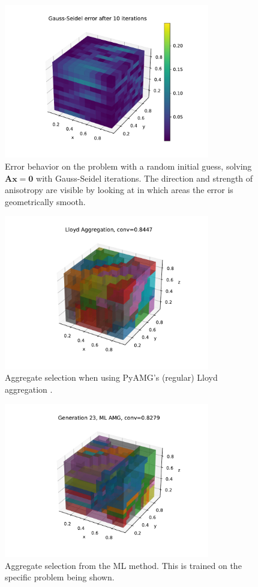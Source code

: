 \documentclass{article}
\newcommand{\mat}[1]{\bm{{#1}}}
\begin{document}
\begin{figure}[h]
  \centering
  \includegraphics[width=0.8\textwidth]{gs_error.pdf}
  \caption{Error behavior on the problem with a random initial guess, solving $\mat{Ax}=\mat{0}$ with Gauss-Seidel iterations.  The direction and strength of anisotropy are visible by looking at in which areas the error is geometrically smooth.}
  \label{fig:gs_error}
\end{figure}

\begin{figure}[h!]
  \centering
  \includegraphics[width=0.8\textwidth]{lloyd_agg.pdf}
  \caption{Aggregate selection when using PyAMG's (regular) Lloyd aggregation \cite{OlSc2018}.}
  \label{fig:lloyd_agg}
\end{figure}

\begin{figure}[h!]
  \centering
  \includegraphics[width=0.8\textwidth]{ml_agg.pdf}
  \caption{Aggregate selection from the ML method.  This is trained on the specific problem being shown.}
  \label{fig:ml_agg}
\end{figure}



\end{document}
